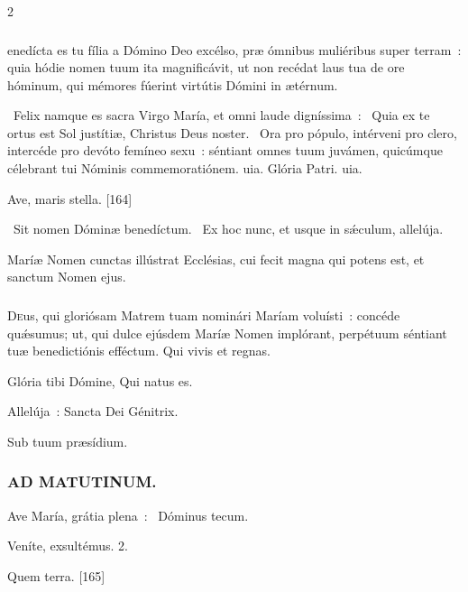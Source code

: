 \documentclass[9pt,twoside]{extarticle}
\begin{document}
\begin{multicols}{2}
\subsubsection*{}
enedícta es tu fília a Dómino Deo excélso, præ ómnibus muliéribus super terram~: quia hódie nomen tuum ita magnificávit, ut non recédat laus tua de ore hóminum, qui mémores fúerint virtútis Dómini in ætérnum.

\begin{tightlist}{}
\item {}~Felix namque es sacra Virgo María, et omni laude digníssima~: \textred{*}~Quia ex te ortus est Sol justítiæ, Christus Deus noster.
~Ora pro pópulo, intérveni pro clero, intercéde pro devóto femíneo sexu~: séntiant omnes tuum juvámen, quicúmque célebrant tui Nóminis commemoratiónem. uia. Glória Patri. uia.
\item {} Ave, maris stella. [164]
\item {}~Sit nomen Dóminæ benedíctum. ~Ex hoc nunc, et usque in sǽculum, allelúja.
\item {} Maríæ Nomen cunctas illústrat Ecclésias, cui fecit magna qui potens est, et sanctum Nomen ejus.
\end{tightlist}

\subsubsection*{\center {}}
\lettrine{D}eus, qui gloriósam Matrem tuam nominári Maríam voluísti~: concéde quǽsumus; ut, qui dulce ejúsdem Maríæ Nomen implórant, perpétuum séntiant tuæ benedictiónis efféctum. Qui vivis et regnas.

\begin{tightlist}{}
\item {} Glória tibi Dómine, Qui natus es.
\item {} Allelúja~: Sancta Dei Génitrix.
\item {} Sub tuum præsídium.
\end{tightlist}

\subsubsection*{\center \textsc{AD MATUTINUM.}}
\begin{tightlist}{}
\item {} Ave María, grátia plena~: \textred{*}~Dóminus tecum.
\item {} Veníte, exsultémus. 2.
\item {} Quem terra. [165]
\end{tightlist}


\end{multicols}
\end{document}
